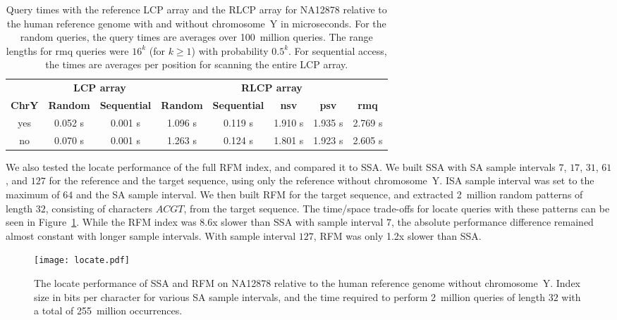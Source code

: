 \documentclass[a4paper,11pt]{llncs}
\newcommand{\SA}{\textsf{SA}}
\newcommand{\ISA}{\textsf{ISA}}
\newcommand{\SSA}{\textsf{SSA}}
\newcommand{\RFM}{\textsf{RFM}}
\newcommand{\LCP}{\textsf{LCP}}
\newcommand{\RLCP}{\textsf{RLCP}}
\newcommand{\locate}{\textsf{locate}}
\newcommand{\nsv}{\textsf{nsv}}
\newcommand{\psv}{\textsf{psv}}
\newcommand{\rmq}{\textsf{rmq}}
\newcommand{\mus}{\textmu{}s}
\begin{document}
\begin{table}
\caption{Query times with the reference \LCP{} array and the \RLCP{} array for NA12878 relative to the human reference genome with and without chromosome~Y in microseconds. For the random queries, the query times are averages over 100~million queries. The range lengths for \rmq{} queries were $16^{k}$ (for $k \ge 1$) with probability $0.5^{k}$. For sequential access, the times are averages per position for scanning the entire \LCP{} array.}\label{table:rlcp queries}
\setlength{\extrarowheight}{2pt}
\setlength{\tabcolsep}{3pt}
\begin{center}
\begin{tabular}{c|cc|ccccc}
\hline
 & \multicolumn{2}{c|}{\textbf{\LCP{} array}} & \multicolumn{5}{c}{\textbf{\RLCP{} array}} \\
\textbf{ChrY} & \textbf{Random} & \textbf{Sequential} & \textbf{Random} & \textbf{Sequential} & \textbf{\nsv} & \textbf{\psv} & \textbf{\rmq} \\
\hline
yes & 0.052 \mus & 0.001 \mus & 1.096 \mus & 0.119 \mus & 1.910 \mus & 1.935 \mus & 2.769 \mus \\
no  & 0.070 \mus & 0.001 \mus & 1.263 \mus & 0.124 \mus & 1.801 \mus & 1.923 \mus & 2.605 \mus \\
\hline
\end{tabular}
\end{center}
\end{table}

We also tested the \locate{} performance of the full \RFM{} index, and compared it to \SSA. We built \SSA{} with \SA{} sample intervals $7$, $17$, $31$, $61$, and $127$ for the reference and the target sequence, using only the reference without chromosome~Y. \ISA{} sample interval was set to the maximum of $64$ and the \SA{} sample interval. We then built \RFM{} for the target sequence, and extracted 2~million random patterns of length $32$, consisting of characters $ACGT$, from the target sequence. The time/space trade-offs for \locate{} queries with these patterns can be seen in Figure~\ref{fig:locate}. While the \RFM{} index was 8.6x slower than \SSA{} with sample interval $7$, the absolute performance difference remained almost constant with longer sample intervals. With sample interval $127$, \RFM{} was only 1.2x slower than \SSA.

\begin{figure}
\begin{center}
\texttt{[image: locate.pdf]}
\end{center}
\caption{The \locate{} performance of \SSA{} and \RFM{} on NA12878 relative to the human reference genome without chromosome~Y. Index size in bits per character for various \SA{} sample intervals, and the time required to perform 2~million queries of length $32$ with a total of 255~million occurrences.}\label{fig:locate}
\end{figure}
\end{document}
